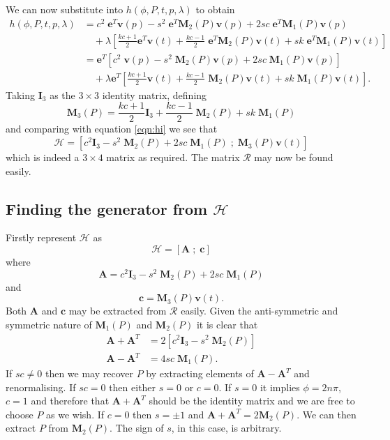 We can now substitute into $h(\phi, P, t, p,\lambda)$ to obtain
\begin{align*}
h(\phi, P, t, p, \lambda) &= c^2\;\mathbf{e}^T\mathbf{v}(p) - s^2\;\mathbf{e}^T\mathbf{M}_2(P)\mathbf{v}(p) + 2sc\;\mathbf{e}^T\mathbf{M}_1(P)\mathbf{v}(p) \\
&\quad+ \lambda\left[ 
 \frac{kc+1}{2} \mathbf{e}^T\mathbf{v}(t) + \frac{kc-1}{2} \;\mathbf{e}^T\mathbf{M}_2(P)\mathbf{v}(t)
+ sk\;\mathbf{e}^T\mathbf{M}_1(P)\mathbf{v}(t)
 \right] \\
& = \mathbf{e}^T \left[ 
 c^2\;\mathbf{v}(p) - s^2\;\mathbf{M}_2(P)\mathbf{v}(p) + 2sc\;\mathbf{M}_1(P)\mathbf{v}(p) 
\right] \\
&\quad+ \lambda\mathbf{e}^T\left[ 
 \frac{kc+1}{2} \mathbf{v}(t) + \frac{kc-1}{2} \;\mathbf{M}_2(P)\mathbf{v}(t)
+ sk\;\mathbf{M}_1(P)\mathbf{v}(t)
 \right].
\end{align*}
Taking $\mathbf{I}_3$ as the $3\times3$ identity matrix, defining
\[
\mathbf{M}_3(P) = \frac{kc+1}{2} \mathbf{I}_3 
+ \frac{kc-1}{2} \;\mathbf{M}_2(P) + sk\;\mathbf{M}_1(P)
\]
and comparing with 
equation \ref{eqn:hi} we see that
\[
\mathcal{H} = \left[
 c^2\mathbf{I}_3 - s^2\;\mathbf{M}_2(P) + 2sc\;\mathbf{M}_1(P) \; ; \;
 \mathbf{M}_3(P)\mathbf{v}(t)
\right]
\]
which is indeed a $3\times4$ matrix as required. The matrix $\mathcal{R}$ may
now be found easily.

\subsection{Finding the generator from $\mathcal{H}$}

Firstly represent $\mathcal{H}$ as
\[
\mathcal{H} = [ \mathbf{A}\; ; \; \mathbf{c} ]
\]
where 
\[\mathbf{A} = c^2\mathbf{I}_3 - s^2\;\mathbf{M}_2(P) + 2sc\;\mathbf{M}_1(P)\]
and
\begin{equation}
\mathbf{c} = \mathbf{M}_3(P)\mathbf{v}(t). \label{eqn:b}
\end{equation}
Both $\mathbf{A}$ and $\mathbf{c}$ may be extracted from $\mathcal{R}$ easily.
Given the anti-symmetric and symmetric nature
of $\mathbf{M}_1(P)$ and $\mathbf{M}_2(P)$ it is clear that
\begin{align*}
\mathbf{A} + \mathbf{A}^T &= 
2\left[ c^2\mathbf{I}_3 - s^2\;\mathbf{M}_2(P) \right] \\
\mathbf{A} - \mathbf{A}^T &= 
4sc\;\mathbf{M}_1(P).
\end{align*}
If $sc \ne 0$ then we may recover $P$ by extracting elements of 
$\mathbf{A} - \mathbf{A}^{T}$ and renormalising. If $sc = 0$ then either
$s = 0$ or $c = 0$. If $s = 0$ it implies $\phi = 2n\pi$, $c = 1$ and 
therefore that 
$\mathbf{A} + \mathbf{A}^{T}$ should be the identity matrix and
we are free to choose $P$ as we wish. If $c = 0$ then $s = \pm 1$
and $\mathbf{A} + \mathbf{A}^{T} = 2 \mathbf{M}_2(P)$. We can then
extract $P$ from $\mathbf{M}_2(P)$. The sign of $s$, in this case, is arbitrary.

